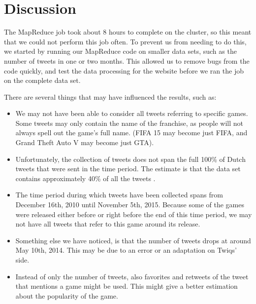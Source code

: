 \section{Discussion}
The MapReduce job took about 8 hours to complete on the cluster, so this meant that we could not perform this job often. To prevent us from needing to do this, we started by running our MapReduce code on smaller data sets, such as the number of tweets in one or two months. This allowed us to remove bugs from the code quickly, and test the data processing for the website before we ran the job on the complete data set.

There are several things that may have influenced the results, such as:
\begin{itemize}
	\item We may not have been able to consider all tweets referring to specific games. Some tweets may only contain the name of the franchise, as people will not always spell out the game's full name. (FIFA 15 may become just FIFA, and Grand Theft Auto V may become just GTA).
	\item Unfortunately, the collection of tweets does not span the full 100\% of Dutch tweets that were sent in the time period. The estimate is that the data set contains approximately 40\% of all the tweets \cite{sangDealingWithBigData}.
	\item The time period during which tweets have been collected spans from December 16th, 2010 until November 5th, 2015. Because some of the games were released either before or right before the end of this time period, we may not have all tweets that refer to this game around its release.
	\item Something else we have noticed, is that the number of tweets drops at around May 10th, 2014. This may be due to an error or an adaptation on Twiqs' side.
	\item Instead of only the number of tweets, also favorites and retweets of the tweet that mentions a game might be used. This might give a better estimation about the popularity of the game.
\end{itemize}